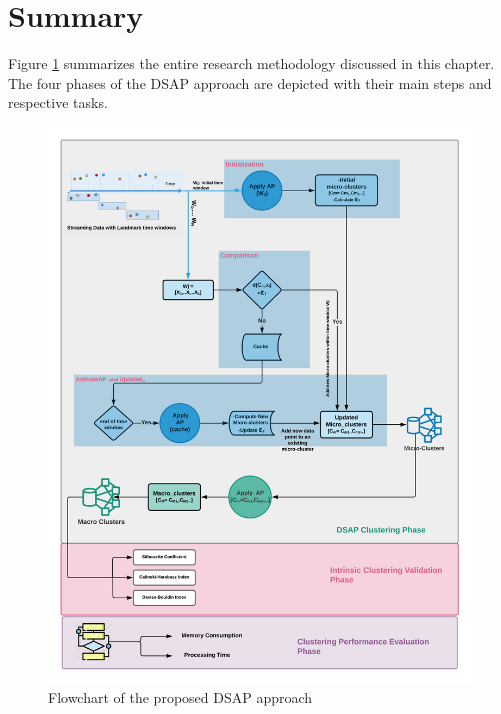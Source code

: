 \documentclass[../UNBThesis2.tex]{subfiles}
\begin{document}
\section{Summary}

Figure \ref{frame} summarizes the entire research methodology discussed in this chapter. The four phases of the DSAP approach are depicted with their main steps and respective tasks. 




\begin{figure}[h]
\centering
\includegraphics[width =1.05\textwidth]{image/Chapters/Chapter4/dsapflowchart1.png} 
\caption{Flowchart of the proposed DSAP approach}
\label{frame}
\end{figure}
\end{document}
